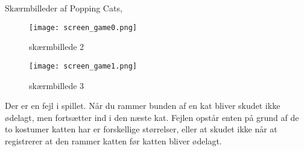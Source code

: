 \documentclass[a4paper]{article}
\begin{document}
Skærmbilleder af Popping Cats,\\
\begin{figure}[h]
	\centering
	\texttt{[image: screen\_game0.png]}
	\caption{skærmbillede 2}
	\label{fig: skitse}
\end{figure}

\begin{figure}[h]
	\centering
	\texttt{[image: screen\_game1.png]}
	\caption{skærmbillede 3}
	\label{fig: skitse}
\end{figure}


Der er en fejl i spillet. Når du rammer bunden af en kat bliver skudet ikke ødelagt, men fortsætter ind i den næste kat. Fejlen opstår enten på grund af de to kostumer katten har er forskellige størrelser, eller at skudet ikke når at registrerer at den rammer katten før katten bliver ødelagt.
\end{document}
